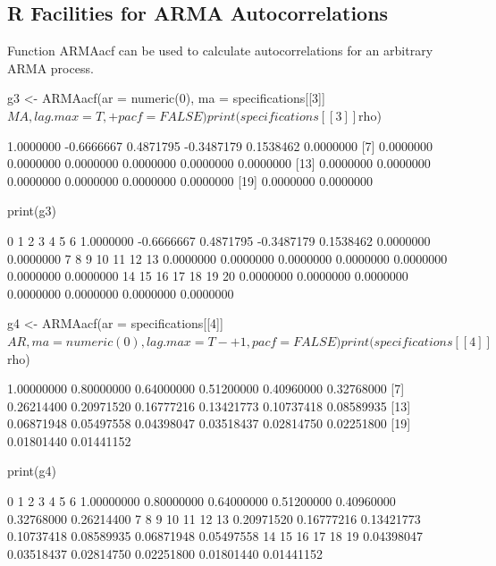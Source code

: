 \documentclass[a4paper]{article}
\renewcommand{\~}{\perispomeni}%
\begin{document}
\subsection{R Facilities for ARMA Autocorrelations}
Function ARMAacf can be used to calculate autocorrelations for an arbitrary ARMA process.
\begin{Schunk}
\begin{Sinput}
 g3 <- ARMAacf(ar = numeric(0), ma = specifications[[3]]$MA, lag.max = T, 
+     pacf = FALSE)
 print(specifications[[3]]$rho)
\end{Sinput}
\begin{Soutput}
 [1]  1.0000000 -0.6666667  0.4871795 -0.3487179  0.1538462  0.0000000
 [7]  0.0000000  0.0000000  0.0000000  0.0000000  0.0000000  0.0000000
[13]  0.0000000  0.0000000  0.0000000  0.0000000  0.0000000  0.0000000
[19]  0.0000000  0.0000000
\end{Soutput}
\begin{Sinput}
 print(g3)
\end{Sinput}
\begin{Soutput}
         0          1          2          3          4          5          6 
 1.0000000 -0.6666667  0.4871795 -0.3487179  0.1538462  0.0000000  0.0000000 
         7          8          9         10         11         12         13 
 0.0000000  0.0000000  0.0000000  0.0000000  0.0000000  0.0000000  0.0000000 
        14         15         16         17         18         19         20 
 0.0000000  0.0000000  0.0000000  0.0000000  0.0000000  0.0000000  0.0000000 
\end{Soutput}
\begin{Sinput}
 g4 <- ARMAacf(ar = specifications[[4]]$AR, ma = numeric(0), lag.max = T - 
+     1, pacf = FALSE)
 print(specifications[[4]]$rho)
\end{Sinput}
\begin{Soutput}
 [1] 1.00000000 0.80000000 0.64000000 0.51200000 0.40960000 0.32768000
 [7] 0.26214400 0.20971520 0.16777216 0.13421773 0.10737418 0.08589935
[13] 0.06871948 0.05497558 0.04398047 0.03518437 0.02814750 0.02251800
[19] 0.01801440 0.01441152
\end{Soutput}
\begin{Sinput}
 print(g4)
\end{Sinput}
\begin{Soutput}
         0          1          2          3          4          5          6 
1.00000000 0.80000000 0.64000000 0.51200000 0.40960000 0.32768000 0.26214400 
         7          8          9         10         11         12         13 
0.20971520 0.16777216 0.13421773 0.10737418 0.08589935 0.06871948 0.05497558 
        14         15         16         17         18         19 
0.04398047 0.03518437 0.02814750 0.02251800 0.01801440 0.01441152 
\end{Soutput}
\end{Schunk}
\end{document}
